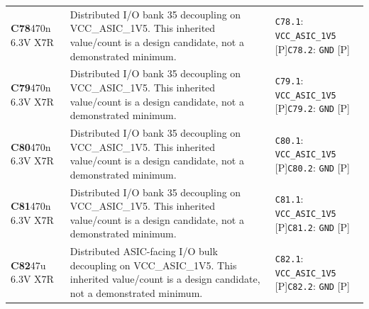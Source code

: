 \documentclass[11pt,a4paper]{article}
\begin{document}
\begin{longtable}{@{}P{27mm}P{83mm}P{58mm}@{}}
\textbf{C78}\newline 470n 6.3V X7R & Distributed I/O bank 35 decoupling on VCC\_ASIC\_1V5. This inherited value/count is a design candidate, not a demonstrated minimum. & \nolinkurl{C78.1}: \nolinkurl{VCC_ASIC_1V5} [P]\newline \nolinkurl{C78.2}: \nolinkurl{GND} [P] \\
\textbf{C79}\newline 470n 6.3V X7R & Distributed I/O bank 35 decoupling on VCC\_ASIC\_1V5. This inherited value/count is a design candidate, not a demonstrated minimum. & \nolinkurl{C79.1}: \nolinkurl{VCC_ASIC_1V5} [P]\newline \nolinkurl{C79.2}: \nolinkurl{GND} [P] \\
\textbf{C80}\newline 470n 6.3V X7R & Distributed I/O bank 35 decoupling on VCC\_ASIC\_1V5. This inherited value/count is a design candidate, not a demonstrated minimum. & \nolinkurl{C80.1}: \nolinkurl{VCC_ASIC_1V5} [P]\newline \nolinkurl{C80.2}: \nolinkurl{GND} [P] \\
\textbf{C81}\newline 470n 6.3V X7R & Distributed I/O bank 35 decoupling on VCC\_ASIC\_1V5. This inherited value/count is a design candidate, not a demonstrated minimum. & \nolinkurl{C81.1}: \nolinkurl{VCC_ASIC_1V5} [P]\newline \nolinkurl{C81.2}: \nolinkurl{GND} [P] \\
\textbf{C82}\newline 47u 6.3V X7R & Distributed ASIC-facing I/O bulk decoupling on VCC\_ASIC\_1V5. This inherited value/count is a design candidate, not a demonstrated minimum. & \nolinkurl{C82.1}: \nolinkurl{VCC_ASIC_1V5} [P]\newline \nolinkurl{C82.2}: \nolinkurl{GND} [P] \\

\end{longtable}
\end{document}
